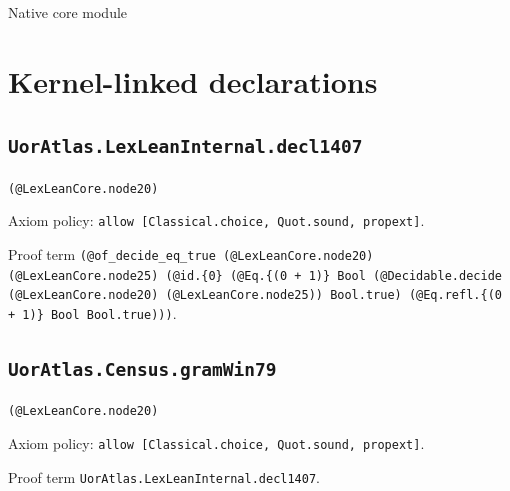 \documentclass[11pt]{article}
\begin{document}
\begin{center}{\LARGE Native core module}\end{center}
\section*{Kernel-linked declarations}
\subsection*{\texttt{UorAtlas.LexLeanInternal.decl1407}}
\noindent\texttt{(@LexLeanCore.node20)}\par
\noindent Axiom policy: \texttt{allow [Classical.choice, Quot.sound, propext]}.\par
\noindent Proof term \texttt{(@of\_decide\_eq\_true (@LexLeanCore.node20) (@LexLeanCore.node25) (@id.\{0\} (@Eq.\{(0 + 1)\} Bool (@Decidable.decide (@LexLeanCore.node20) (@LexLeanCore.node25)) Bool.true) (@Eq.refl.\{(0 + 1)\} Bool Bool.true)))}.\par
\subsection*{\texttt{UorAtlas.Census.gramWin79}}
\noindent\texttt{(@LexLeanCore.node20)}\par
\noindent Axiom policy: \texttt{allow [Classical.choice, Quot.sound, propext]}.\par
\noindent Proof term \texttt{UorAtlas.LexLeanInternal.decl1407}.\par
\end{document}
